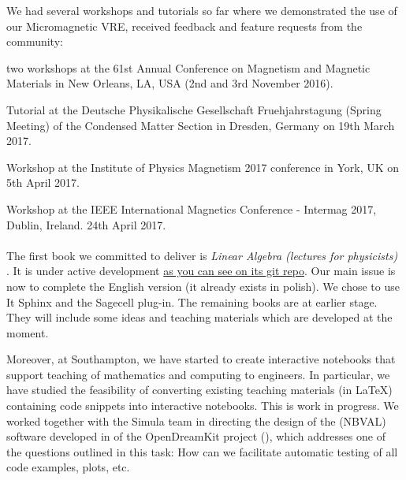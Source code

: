\documentclass{deliverablereport}
\begin{document}
We had several workshops and tutorials so far where we demonstrated the use of our Micromagnetic VRE, received feedback and feature requests from the community:

\begin{compactitem}
\item two workshops at the 61st Annual Conference on Magnetism and Magnetic Materials in New Orleans,
    LA, USA (2nd and 3rd November 2016).
\item Tutorial at the Deutsche Physikalische Gesellschaft Fruehjahrstagung (Spring Meeting) of the Condensed Matter Section in Dresden, Germany on 19th March 2017.
\item Workshop at the Institute of Physics Magnetism 2017 conference in York, UK on 5th April 2017.
\item Workshop at the IEEE International Magnetics Conference - Intermag 2017, Dublin, Ireland. 24th April 2017.
\end{compactitem}

\paragraph{}


The first book we committed to deliver is \emph{Linear Algebra (lectures for physicists)} . It is under active development \href{https://github.com/Hadriamit/iODKbook2}{as you can see on its git repo}. Our main issue is now to complete the English version (it already exists in polish). We chose to use It Sphinx and the Sagecell plug-in. The remaining books are at earlier stage. They will include some ideas and teaching materials which are developed at the moment.

Moreover, at Southampton, we have started to create interactive notebooks that support teaching of mathematics and computing to engineers. In particular, we have studied the feasibility of converting existing teaching materials (in LaTeX) containing code snippets into interactive notebooks. This is work in progress. We worked together with the Simula team in directing the design of the (NBVAL) software developed in  of the OpenDreamKit project (), which addresses one of the questions outlined in this task: How can we facilitate automatic testing of all code examples, plots, etc.

\paragraph{}
\end{document}
